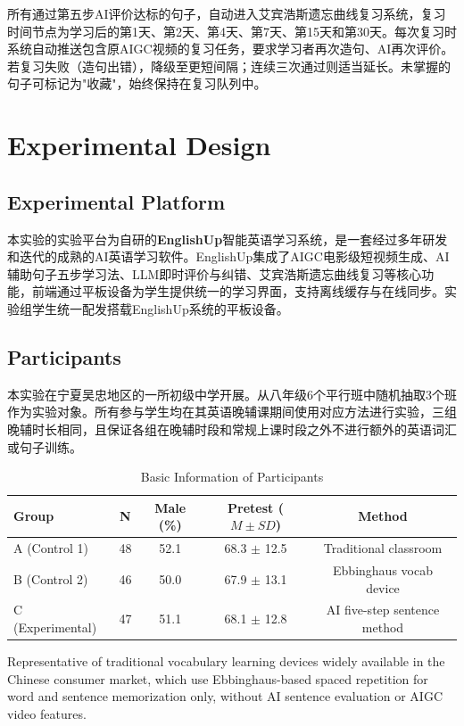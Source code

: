 \documentclass[Afour,sageapa,times]{sagej}
\begin{document}
所有通过第五步AI评价达标的句子，自动进入艾宾浩斯遗忘曲线复习系统，复习时间节点为学习后的第1天、第2天、第4天、第7天、第15天和第30天。每次复习时系统自动推送包含原AIGC视频的复习任务，要求学习者再次造句、AI再次评价。若复习失败（造句出错），降级至更短间隔；连续三次通过则适当延长。未掌握的句子可标记为"收藏"，始终保持在复习队列中。


\section{Experimental Design}  %

\subsection{Experimental Platform}
本实验的实验平台为自研的\textbf{EnglishUp}智能英语学习系统，是一套经过多年研发和迭代的成熟的AI英语学习软件。EnglishUp集成了AIGC电影级短视频生成、AI辅助句子五步学习法、LLM即时评价与纠错、艾宾浩斯遗忘曲线复习等核心功能，前端通过平板设备为学生提供统一的学习界面，支持离线缓存与在线同步。实验组学生统一配发搭载EnglishUp系统的平板设备。

\subsection{Participants}
本实验在宁夏吴忠地区的一所初级中学开展。从八年级6个平行班中随机抽取3个班作为实验对象。所有参与学生均在其英语晚辅课期间使用对应方法进行实验，三组晚辅时长相同，且保证各组在晚辅时段和常规上课时段之外不进行额外的英语词汇或句子训练。

\begin{table}[H]
\centering
\small
\caption{Basic Information of Participants}
\begin{tabular}{lcccc}
\toprule
\textbf{Group} & \textbf{N} & \textbf{Male (\%)} & \textbf{Pretest ($M \pm SD$)} & \textbf{Method} \\
\midrule
A (Control 1) & 48 & 52.1 & 68.3 $\pm$ 12.5 & Traditional classroom \\
B (Control 2) & 46 & 50.0 & 67.9 $\pm$ 13.1 & Ebbinghaus vocab device\tnote{a} \\
C (Experimental) & 47 & 51.1 & 68.1 $\pm$ 12.8 & AI five-step sentence method \\
\bottomrule
\end{tabular}
\begin{tablenotes}
\item[a] Representative of traditional vocabulary learning devices widely available in the Chinese consumer market, which use Ebbinghaus-based spaced repetition for word and sentence memorization only, without AI sentence evaluation or AIGC video features.
\end{tablenotes}
\end{table}
\end{document}
